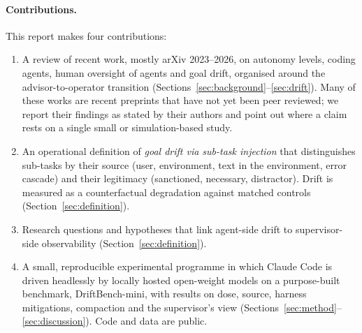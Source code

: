 \paragraph{Contributions.} This report makes four contributions:
\begin{enumerate}
  \item A review of recent work, mostly arXiv 2023--2026, on autonomy levels, coding agents, human
        oversight of agents and goal drift, organised around the advisor-to-operator transition
        (Sections~\ref{sec:background}--\ref{sec:drift}). Many of these works are recent preprints
        that have not yet been peer reviewed; we report their findings as stated by their authors
        and point out where a claim rests on a single small or simulation-based study.
  \item An operational definition of \emph{goal drift via sub-task injection} that distinguishes
        sub-tasks by their source (user, environment, text in the environment, error cascade) and
        their legitimacy (sanctioned, necessary, distractor). Drift is measured as a counterfactual
        degradation against matched controls (Section~\ref{sec:definition}).
  \item Research questions and hypotheses that link agent-side drift to supervisor-side
        observability (Section~\ref{sec:definition}).
  \item A small, reproducible experimental programme in which Claude Code is driven headlessly by
        locally hosted open-weight models on a purpose-built benchmark, DriftBench-mini, with
        results on dose, source, harness mitigations, compaction and the supervisor's view
        (Sections~\ref{sec:method}--\ref{sec:discussion}). Code and data are public.
\end{enumerate}

